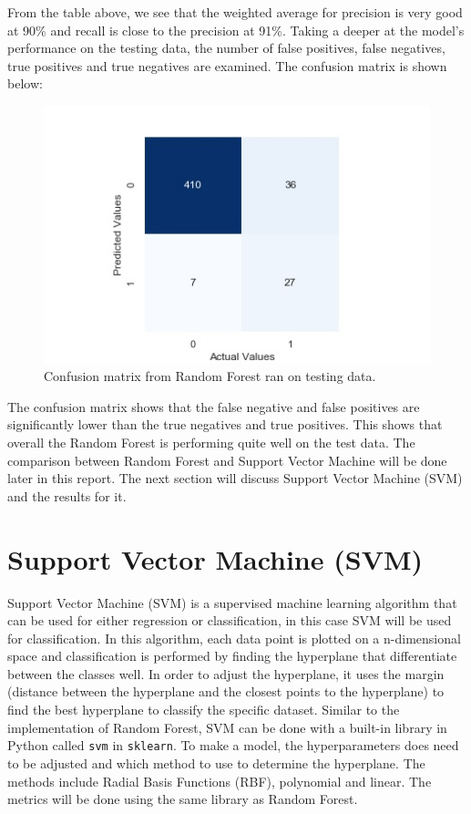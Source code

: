 \documentclass[a4paper,titlepage]{article}
\begin{document}
	\noindent From the table above, we see that the weighted average for precision is very good at 90\% and recall is close to the precision at 91\%. Taking a deeper at the model's performance on the testing data, the number of false positives, false negatives, true positives and true negatives are examined. The confusion matrix is shown below:
	\begin{figure}[H]
		\centering
		\includegraphics[scale=0.6]{img/twoclass_rf.jpg}
		\caption{Confusion matrix from Random Forest ran on testing data.}
		\label{confmatrf}
	\end{figure}

	The confusion matrix shows that the false negative and false positives are significantly lower than the true negatives and true positives. This shows that overall the Random Forest is performing quite well on the test data. The comparison between Random Forest and Support Vector Machine will be done later in this report. The next section will discuss Support Vector Machine (SVM) and the results for it.
	
	\section{Support Vector Machine (SVM)}
	Support Vector Machine (SVM) is a supervised machine learning algorithm that can be used for either regression or classification, in this case SVM will be used for classification. In this algorithm, each data point is plotted on a n-dimensional space and classification is performed by finding the hyperplane that differentiate between the classes well. In order to adjust the hyperplane, it uses the margin (distance between the hyperplane and the closest points to the hyperplane) to find the best hyperplane to classify the specific dataset. Similar to the implementation of Random Forest, SVM can be done with a built-in library in Python called \texttt{svm} in \texttt{sklearn}. To make a model, the hyperparameters does need to be adjusted and which method to use to determine the hyperplane. The methods include Radial Basis Functions (RBF), polynomial and linear. The metrics will be done using the same library as Random Forest.
\end{document}

